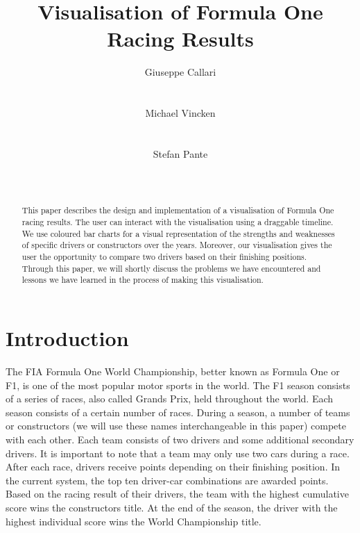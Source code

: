 \documentclass{sigchi}
\begin{document}
\title{Visualisation of Formula One Racing Results}

\author{
  \alignauthor Giuseppe Callari\\
    \\
    \\
  \alignauthor Michael Vincken\\
    \\
    \\
  \alignauthor Stefan Pante\\
    \\
    \\
}

\maketitle

\begin{abstract}
This paper describes the design and implementation of a visualisation of Formula One racing results. The user can interact with the visualisation using a draggable timeline. We use coloured bar charts for a visual representation of the strengths and weaknesses of specific drivers or constructors over the years. Moreover, our visualisation gives the user the opportunity to compare two drivers based on their finishing positions. Through this paper, we will shortly discuss the problems we have encountered and lessons we have learned in the process of making this visualisation.

\end{abstract}




\section{Introduction}

The FIA Formula One World Championship, better known as Formula One or F1, is one of the most popular motor sports in the world. The F1 season consists of a series of races, also called Grands Prix, held throughout the world. Each season consists of a certain number of races. During a season, a number of teams or constructors (we will use these names interchangeable in this paper) compete with each other. Each team consists of two drivers and some additional secondary drivers. It is important to note that a team may only use two cars during a race. After each race, drivers receive points depending on their finishing position. In the current system, the top ten driver-car combinations are awarded points. Based on the racing result of their drivers, the team with the highest cumulative score wins the constructors title. At the end of the season, the driver with the highest individual score wins the World Championship title.
\end{document}
